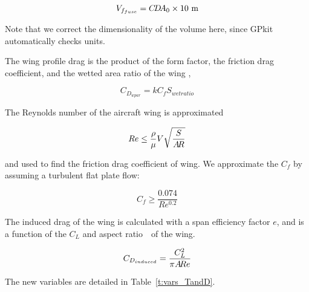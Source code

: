 \begin{equation}
    V_{f_{fuse}} = C\!D\!A_0 \times 10 ~\mathrm{m}
\label{e:vffuse}
\end{equation}

Note that we correct the dimensionality of the volume here, since GPkit automatically checks units.

The wing profile drag is the product of the form factor, the friction drag coefficient,
and the wetted area ratio of the wing \cite{gp_ac_design},

\begin{equation}
    C_{D_{wpar}} = k C_f S_{wetratio}
\label{e:cdwpar}
\end{equation}

The Reynolds number of the aircraft wing is approximated

\begin{equation}
    Re \leq \frac{\rho}{\mu} V \sqrt{\frac{S}{A\!R}}
\label{e:re}
\end{equation}

and used to find the friction drag coefficient of wing. We approximate the $C_f$ by assuming a
turbulent flat plate flow:

\begin{equation}
    C_f \geq \frac{0.074} {Re^{0.2}}
\end{equation}

The induced drag of the wing is calculated with a span efficiency factor $e$, and is a
function of the $C_L$ and aspect ratio~\AR~of the wing.

\begin{equation}
    C_{D_{induced}} = \frac{C_L^2}{\pi A\!R e}
\label{e:cdinduced}
\end{equation}

The new variables are detailed in Table~\ref{t:vars_TandD}.

